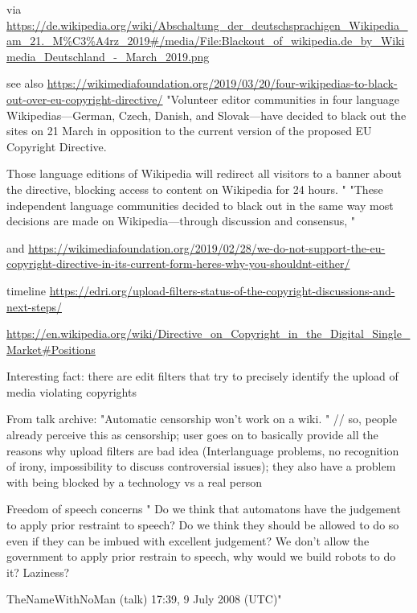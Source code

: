 via
\url{https://de.wikipedia.org/wiki/Abschaltung_der_deutschsprachigen_Wikipedia_am_21._M%C3%A4rz_2019#/media/File:Blackout_of_wikipedia.de_by_Wikimedia_Deutschland_-_March_2019.png}

see also
\url{https://wikimediafoundation.org/2019/03/20/four-wikipedias-to-black-out-over-eu-copyright-directive/}
"Volunteer editor communities in four language Wikipedias—German, Czech, Danish, and Slovak—have decided to black out the sites on 21 March in opposition to the current version of the proposed EU Copyright Directive.

Those language editions of Wikipedia will redirect all visitors to a banner about the directive, blocking access to content on Wikipedia for 24 hours. "
"These independent language communities decided to black out in the same way most decisions are made on Wikipedia—through discussion and consensus, "

and
\url{https://wikimediafoundation.org/2019/02/28/we-do-not-support-the-eu-copyright-directive-in-its-current-form-heres-why-you-shouldnt-either/}

timeline
\url{https://edri.org/upload-filters-status-of-the-copyright-discussions-and-next-steps/}

\url{https://en.wikipedia.org/wiki/Directive_on_Copyright_in_the_Digital_Single_Market#Positions}

Interesting fact: there are edit filters that try to precisely identify the upload of media violating copyrights


From talk archive:
"Automatic censorship won't work on a wiki. " // so, people already perceive this as censorship; user goes on to basically provide all the reasons why upload filters are bad idea (Interlanguage problems, no recognition of irony, impossibility to discuss controversial issues); they also have a problem with being blocked by a technology vs a real person

Freedom of speech concerns
" Do we think that automatons have the judgement to apply prior restraint to speech? Do we think they should be allowed to do so even if they can be imbued with excellent judgement? We don't allow the government to apply prior restrain to speech, why would we build robots to do it? Laziness?

TheNameWithNoMan (talk) 17:39, 9 July 2008 (UTC)"

